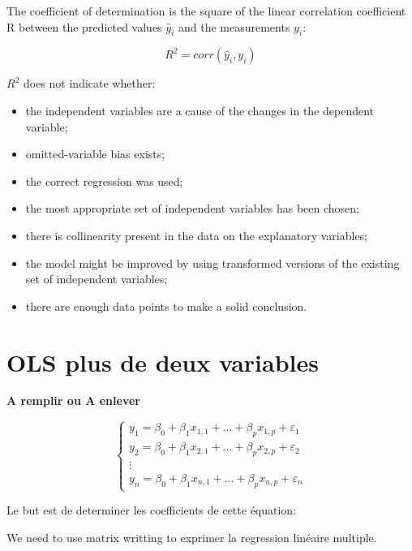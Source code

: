 \documentclass[
]{report}
\providecommand{\tightlist}{%
  \setlength{\itemsep}{0pt}\setlength{\parskip}{0pt}}
\begin{document}
The coefficient of determination is the square of the linear correlation coefficient R between the predicted values \(\hat{y}_{i}\) and the measurements \(y_i\):

\[R^2=corr(\hat{y}_{i},y_i)\]

\(R^2\) does not indicate whether:

\begin{itemize}
\tightlist
\item
  the independent variables are a cause of the changes in the dependent variable;
\item
  omitted-variable bias exists;
\item
  the correct regression was used;
\item
  the most appropriate set of independent variables has been chosen;
\item
  there is collinearity present in the data on the explanatory variables;
\item
  the model might be improved by using transformed versions of the existing set of independent variables;
\item
  there are enough data points to make a solid conclusion.
\end{itemize}

\hypertarget{ols-plus-de-deux-variables}{%
\section{OLS plus de deux variables}\label{ols-plus-de-deux-variables}}

\textbf{A remplir ou A enlever}

\[{\displaystyle{\begin{cases}y_{1}=\beta_{0}+\beta_{1}x_{1,1}+\ldots +\beta_{p}x_{1,p}+\varepsilon_{1}\\y_{2}=\beta_{0}+\beta_{1}x_{2,1}+\ldots +\beta_{p}x_{2,p}+\varepsilon_{2}\\\vdots \\y_{n}=\beta_{0}+\beta_{1}x_{n,1}+\ldots +\beta_{p}x_{n,p}+\varepsilon _{n}\end{cases}}}\]

Le but est de determiner les coefficients de cette équation:

We need to use matrix writting to exprimer la regression linéaire multiple.
\end{document}
